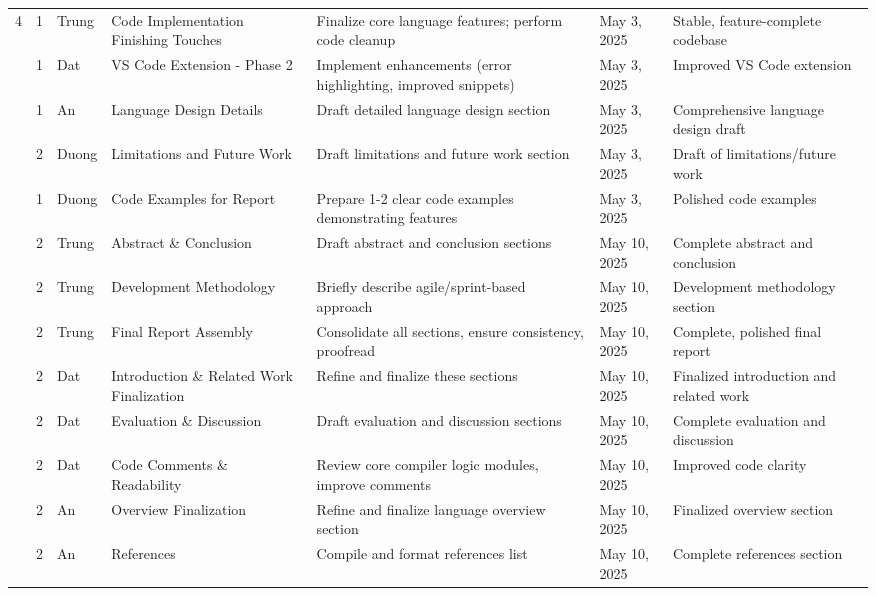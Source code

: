 \documentclass[11pt]{article}
\begin{document}
\begin{longtable}{|p{}|p{}|p{}|p{}|p{}|p{}|p{}|}
\rowcolor{week4color} 
4 & 1 & Trung & Code Implementation Finishing Touches & Finalize core language features; perform code cleanup & May 3, 2025 & Stable, feature-complete codebase \\
\rowcolor{week4color} 
& 1& Dat & VS Code Extension - Phase 2 & Implement enhancements (error highlighting, improved snippets) & May 3, 2025 & Improved VS Code extension \\
\rowcolor{week4color} 
& 1& An & Language Design Details & Draft detailed language design section & May 3, 2025 & Comprehensive language design draft \\
\rowcolor{week4color} 
& 2& Duong & Limitations and Future Work & Draft limitations and future work section & May 3, 2025 & Draft of limitations/future work \\
\rowcolor{week4color} 
& 1& Duong & Code Examples for Report & Prepare 1-2 clear code examples demonstrating features & May 3, 2025 & Polished code examples \\
\rowcolor{week4color} 
& 2 & Trung & Abstract \& Conclusion & Draft abstract and conclusion sections & May 10, 2025 & Complete abstract and conclusion \\
\rowcolor{week4color} 
& 2& Trung & Development Methodology & Briefly describe agile/sprint-based approach & May 10, 2025 & Development methodology section \\
\rowcolor{week4color} 
& 2& Trung & Final Report Assembly & Consolidate all sections, ensure consistency, proofread & May 10, 2025 & Complete, polished final report \\
\rowcolor{week4color} 
& 2& Dat & Introduction \& Related Work Finalization & Refine and finalize these sections & May 10, 2025 & Finalized introduction and related work \\
\rowcolor{week4color} 
& 2& Dat & Evaluation \& Discussion & Draft evaluation and discussion sections & May 10, 2025 & Complete evaluation and discussion \\
\rowcolor{week4color} 
& 2& Dat & Code Comments \& Readability & Review core compiler logic modules, improve comments & May 10, 2025 & Improved code clarity \\
\rowcolor{week4color} 
& 2& An & Overview Finalization & Refine and finalize language overview section & May 10, 2025 & Finalized overview section \\
\rowcolor{week4color} 
& 2& An & References & Compile and format references list & May 10, 2025 & Complete references section \\

\end{longtable}
\end{document}
